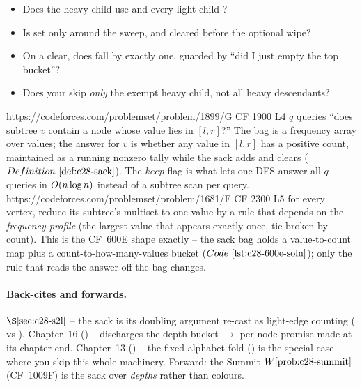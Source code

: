 \begin{stuckbox}
\begin{itemize}[nosep, leftmargin=1.4em]
  \item Does the heavy child use  and every light child
        ?
  \item Is  set only around the  sweep, and cleared
        before the optional wipe?
  \item On a clear, does  fall by exactly one, guarded by
        ``did I just empty the top bucket''?
  \item Does your  skip \emph{only} the exempt heavy child, not all
        heavy descendants?
\end{itemize}
\end{stuckbox}

\begin{practiceset}
    {https://codeforces.com/problemset/problem/1899/G}
    {CF 1900 L4}
    {\(q\) queries ``does subtree \(v\) contain a node whose value lies in
     \([l,r]\)?''  The bag is a frequency array over values; the answer for
     \(v\) is whether any value in \([l,r]\) has a positive count, maintained as
     a running nonzero tally while the sack adds and clears (\(\defref{c28-sack}\)).
     The \(\mathit{keep}\) flag is what lets one DFS answer all \(q\) queries in
     \(O(n\log n)\) instead of a subtree scan per query.}
    {https://codeforces.com/problemset/problem/1681/F}
    {CF 2300 L5}
    {for every vertex, reduce its subtree's multiset to one value by a rule that
     depends on the \emph{frequency profile} (the largest value that appears
     exactly once, tie-broken by count).  This is the CF~600E shape exactly --
     the sack bag holds a value-to-count map plus a count-to-how-many-values
     bucket (\(\coderef{c28-600e-soln}\)); only the rule that reads the answer
     off the bag changes.}
\end{practiceset}

\paragraph{Back-cites and forwards.}
\(\secref{c28-s2l}\) -- the sack is its doubling argument re-cast as light-edge
counting ( vs ).  Chapter~16 () --
 discharges the depth-bucket \(\to\) per-node promise
made at its chapter end.  Chapter~13 () -- the fixed-alphabet fold
() is the special case where you skip this whole
machinery.  Forward: the Summit \(\probref{c28-summit}\) (CF~1009F) is the sack
over \emph{depths} rather than colours.

